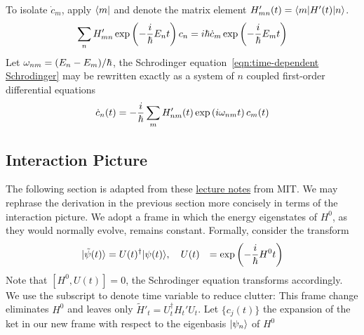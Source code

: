 To isolate $\dot c_m$, apply $\langle m|$ and denote the matrix element $H'_{mn}(t)=\left\langle m|H'(t)|n \right\rangle$. 
\[
    \sum_n H'_{mn} \exp\left(-\dfrac i {\hbar} E_nt\right) c_n = i\hbar \dot c_m \exp\left(-\dfrac i {\hbar} E_mt\right)
\] 
Let $\omega_{nm} = (E_n - E_m)/\hbar$, the Schrodinger equation~\ref{eqn:time-dependent Schrodinger} 
may be rewritten exactly as a system of $n$ coupled first-order differential equations
\begin{equation}\label{eqn:time-dependent systems}
    \dot c_n(t) = -\dfrac i {\hbar} \sum_m H'_{nm}(t) \exp\left(i \omega_{nm} t\right) c_m(t)
\end{equation}



\subsection{Interaction Picture}
The following section is adapted from these 
\href{https://ocw.mit.edu/courses/8-06-quantum-physics-iii-spring-2018/89ef6d5958ee59bae9a91345c3d8c8e4_MIT8_06S18ch4.pdf}
{lecture notes} from MIT. 
We may rephrase the derivation in the previous section more concisely 
in terms of the interaction picture. 
We adopt a frame in which the energy eigenstates of $H^0$, as they would normally evolve, 
remains constant. Formally, consider the transform 
\[\begin{aligned}
    |\tilde \psi(t)\rangle &= U(t)^\dag|\psi(t)\rangle , \quad U(t) &= \exp\left(-\dfrac i {\hbar} H^0 t\right)
\end{aligned}\] 
Note that $[H^0, U(t)] = 0$, the Schrodinger equation transforms accordingly. 
We use the subscript to denote time variable to reduce clutter: 
This frame change eliminates $H^0$ and leaves only $\tilde H'_t=U_t^\dag H_t'U_t$. 
Let $\{c_j(t)\}$ the expansion of the ket 
in our new frame with respect to the eigenbasis $|\psi_{n}\rangle$ of $H^0$

